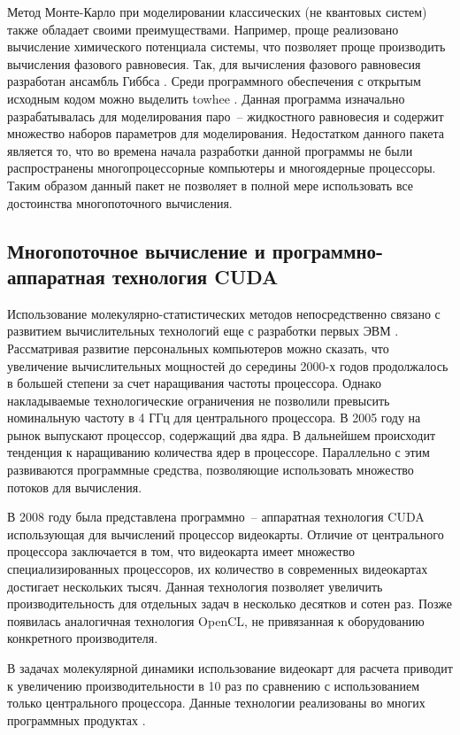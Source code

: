 Метод Монте-Карло при моделировании классических (не квантовых систем) также обладает своими преимуществами. Например, проще реализовано вычисление химического потенциала системы, что позволяет проще производить вычисления фазового равновесия. Так, для вычисления фазового равновесия разработан ансамбль Гиббса \cite{Panagiotopoulos1987,Orkoulas1994}. Среди программного обеспечения с открытым исходным кодом можно выделить towhee \cite{Martin2013}. Данная программа изначально разрабатывалась для моделирования паро~-- жидкостного равновесия и содержит множество наборов параметров для моделирования. Недостатком данного пакета является то, что во времена начала разработки данной программы не были распространены многопроцессорные компьютеры и многоядерные процессоры. Таким образом данный пакет не позволяет в полной мере использовать все достоинства многопоточного вычисления.



\subsection{Многопоточное вычисление и программно-аппаратная технология CUDA}
Использование молекулярно-статистических методов непосредственно связано с развитием вычислительных технологий еще с разработки первых ЭВМ \cite{Allen1988}. Рассматривая развитие персональных компьютеров можно сказать, что увеличение вычислительных мощностей до середины 2000-х годов продолжалось в большей степени за счет наращивания частоты процессора. Однако накладываемые технологические ограничения не позволили превысить номинальную частоту в 4 ГГц для центрального процессора. В 2005 году на рынок выпускают процессор, содержащий два ядра. В дальнейшем происходит тенденция к наращиванию количества ядер в процессоре. Параллельно с этим развиваются программные средства, позволяющие использовать множество потоков для вычисления.

В 2008 году была представлена программно~-- аппаратная технология CUDA использующая для вычислений процессор видеокарты. Отличие от центрального процессора заключается в том, что видеокарта имеет множество специализированных процессоров, их количество в современных видеокартах достигает нескольких тысяч. Данная технология позволяет увеличить производительность для отдельных задач в несколько десятков и сотен раз. Позже появилась аналогичная технология OpenCL, не привязанная к оборудованию конкретного производителя.

В задачах молекулярной динамики использование видеокарт для расчета приводит к увеличению производительности в 10 раз по сравнению с использованием только центрального процессора. Данные технологии реализованы во многих программных продуктах \cite{wiki_progs}.

